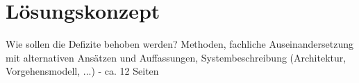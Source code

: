 \chapter{Lösungskonzept}
\thispagestyle{fancy}

Wie sollen die Defizite behoben werden? Methoden, fachliche Auseinandersetzung mit alternativen Ansätzen und Auffassungen, Systembeschreibung (Architektur, Vorgehensmodell, ...) - ca. 12 Seiten

